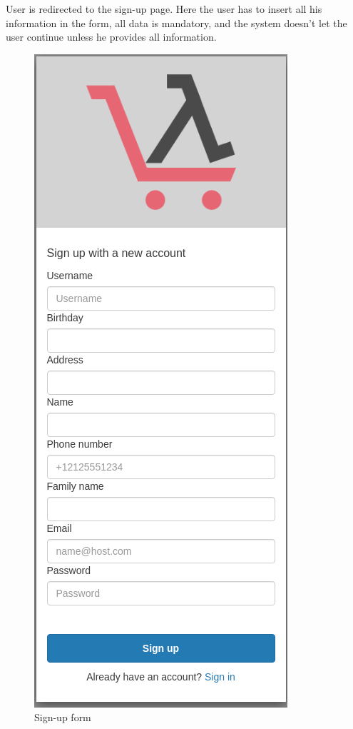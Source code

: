User is redirected to the sign-up page. Here the user has to insert all his information in the form, all data is mandatory, and the system doesn't let the user continue unless he provides all information. \begin{figure}[!ht]
    \caption{Sign-up form}
    \vspace{10px}
    \includegraphics[scale=0.2]{../../../../Images/userManual/signUp.png}
    \centering
\end{figure}
